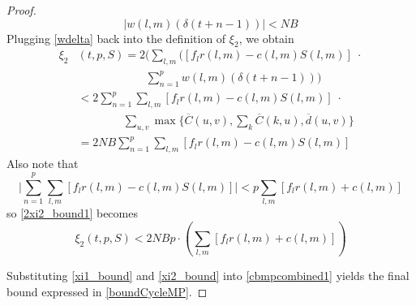 \begin{proof}
\begin{equation} \label{wdelta}
\vert w(l,m)(\delta(t + n -1)) \vert <NB
\end{equation}
Plugging \eqref{wdelta} back into the definition of $\xi_2$, we obtain
\begin{align} \nonumber 
\xi_2&(t,p,S) = 2\bigg( \sum_{l,m}\big([f_{l}r(l,m) - c(l,m)S(l,m)] \; \cdot \\  \nonumber
&\qquad \qquad \qquad  \sum_{n=1}^{p}  w(l,m)( \delta(t + n - 1))\bigg)  \\ \nonumber
&< 2 \sum_{n=1}^{p}  \sum_{l,m}[f_{l}r(l,m) - c(l,m)S(l,m)] \; \cdot \\ \nonumber
&\qquad \qquad \sum_{u,v} \max\Big\{  \overline{C}(u,v), \sum_{k}\overline{C}(k,u), \overline{d}(u,v)\Big\} \\
& = 2NB \sum_{n=1}^{p}  \sum_{l,m}[f_{l}r(l,m) - c(l,m)S(l,m)] \label{2xi2_bound1}
\end{align}
Also note that 
\begin{equation}
\Big| \sum_{n=1}^{p}  \sum_{l,m}[f_{l}r(l,m) - c(l,m)S(l,m)] \Big| < p \sum_{l,m}[f_{l}r(l,m) + c(l,m)]
\end{equation}
so \eqref{2xi2_bound1} becomes
\begin{equation} \label{xi2_bound}
\xi_2(t,p,S) < 2 NB p \cdot \left( \sum_{l,m}[f_{l}r(l,m) + c(l,m)]\right)
\end{equation}

Substituting \eqref{xi1_bound} and \eqref{xi2_bound} into \eqref{cbmpcombined1} yields the final bound expressed in
 \eqref{boundCycleMP}.
\end{proof}

